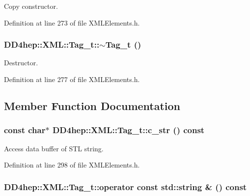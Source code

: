 Copy constructor. 

Definition at line 273 of file XMLElements.h.\hypertarget{class_d_d4hep_1_1_x_m_l_1_1_tag__t_aa35071670ab5dcfe1c20aa8370c818a7}{
\subsubsection[{$\sim$Tag\_\-t}]{\setlength{\rightskip}{0pt plus 5cm}DD4hep::XML::Tag\_\-t::$\sim$Tag\_\-t ()}}
\label{class_d_d4hep_1_1_x_m_l_1_1_tag__t_aa35071670ab5dcfe1c20aa8370c818a7}


Destructor. 

Definition at line 277 of file XMLElements.h.

\subsection{Member Function Documentation}
\hypertarget{class_d_d4hep_1_1_x_m_l_1_1_tag__t_a0ba8d69ddce7d8b47ede593a3bbf8a60}{
\subsubsection[{c\_\-str}]{\setlength{\rightskip}{0pt plus 5cm}const char$\ast$ DD4hep::XML::Tag\_\-t::c\_\-str () const}}
\label{class_d_d4hep_1_1_x_m_l_1_1_tag__t_a0ba8d69ddce7d8b47ede593a3bbf8a60}


Access data buffer of STL string. 

Definition at line 298 of file XMLElements.h.\hypertarget{class_d_d4hep_1_1_x_m_l_1_1_tag__t_a08b49a574cd5322b0456c9da73231394}{
\subsubsection[{operator const std::string \&}]{\setlength{\rightskip}{0pt plus 5cm}DD4hep::XML::Tag\_\-t::operator const std::string \& () const}}
\label{class_d_d4hep_1_1_x_m_l_1_1_tag__t_a08b49a574cd5322b0456c9da73231394}


